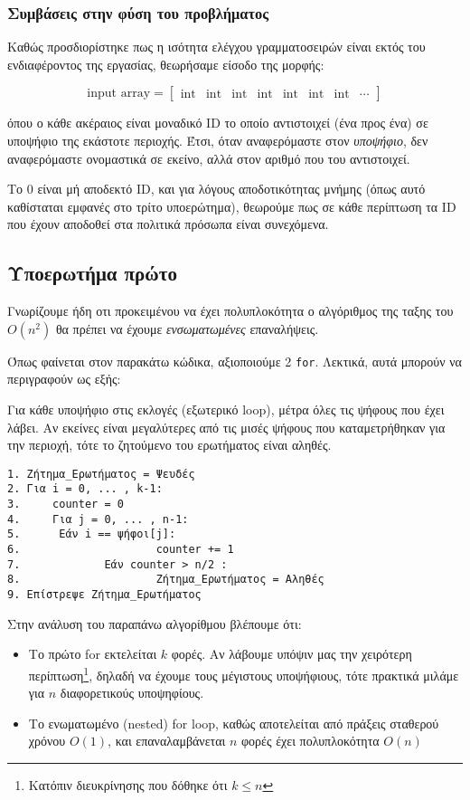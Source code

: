 \documentclass[a4paper,11pt]{article}
\begin{document}
\subsubsection{Συμβάσεις στην φύση του προβλήματος}
\label{sec:org2fa039c}
Καθώς προσδιορίστηκε πως η ισότητα ελέγχου γραμματοσειρών είναι εκτός του
ενδιαφέροντος της εργασίας, θεωρήσαμε είσοδο της μορφής:

\begin{equation}
\label{eq:3}
\text{input array} = 
\begin{bmatrix}
\text{int} &
\text{int} &
\text{int} &
\text{int} &
\text{int} &
\text{int} &
\text{int} & \cdots
\end{bmatrix}
\end{equation}

όπου ο κάθε ακέραιος είναι μοναδικό ID το οποίο αντιστοιχεί (ένα προς ένα) σε
υποψήφιο της εκάστοτε περιοχής. Έτσι, όταν αναφερόμαστε στον \emph{υποψήφιο}, δεν
αναφερόμαστε ονομαστικά σε εκείνο, αλλά στον αριθμό που του αντιστοιχεί.

Το 0 είναι μή αποδεκτό ID, και για λόγους αποδοτικότητας μνήμης (όπως αυτό
καθίσταται εμφανές στο τρίτο υποερώτημα), θεωρούμε πως σε κάθε περίπτωση τα ID
που έχουν αποδοθεί στα πολιτικά πρόσωπα είναι συνεχόμενα.

\subsection{Υποερωτήμα πρώτο}
\label{sec:org3231211}
Γνωρίζουμε ήδη οτι προκειμένου να έχει πολυπλοκότητα ο αλγόριθμος της ταξης του
\(O(n^2)\) θα πρέπει να έχουμε \emph{ενσωματωμένες} επαναλήψεις.

Όπως φαίνεται στον παρακάτω κώδικα, αξιοποιούμε 2 \texttt{for}. Λεκτικά, αυτά μπορούν να
περιγραφούν ως εξής:

Για κάθε υποψήφιο στις εκλογές (εξωτερικό loop), μέτρα όλες τις ψήφους που έχει
λάβει. Αν εκείνες είναι μεγαλύτερες από τις μισές ψήφους που καταμετρήθηκαν για
την περιοχή, τότε το ζητούμενο του ερωτήματος είναι αληθές.

\begin{verbatim}
1. Ζήτημα_Ερωτήματος = Ψευδές
2. Για i = 0, ... , k-1:
3.     counter = 0
4.     Για j = 0, ... , n-1:
5. 		Εάν i == ψήφοι[j]:
6.                     counter += 1
7.             Εάν counter > n/2 :
8.                     Ζήτημα_Ερωτήματος = Αληθές
9. Επίστρεψε Ζήτημα_Ερωτήματος
\end{verbatim}


Στην ανάλυση του παραπάνω αλγορίθμου βλέπουμε ότι:
\begin{itemize}
\item Το πρώτο for εκτελείται \(k\) φορές. Αν λάβουμε υπόψιν μας την χειρότερη
περίπτωση\footnote{Κατόπιν διευκρίνησης που δόθηκε ότι \(k\leq n\)}, δηλαδή να έχουμε τους μέγιστους υποψήφιους, τότε πρακτικά μιλάμε
για \(n\) διαφορετικούς υποψηφίους.
\item Το ενωματωμένο (nested) for loop, καθώς αποτελείται από πράξεις σταθερού
χρόνου \(O(1)\), και επαναλαμβάνεται \(n\) φορές έχει πολυπλοκότητα \(O(n)\)
\end{itemize}
\end{document}
